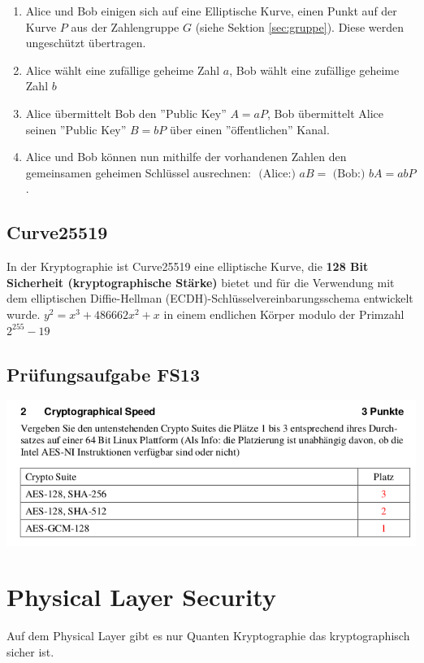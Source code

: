 \begin{enumerate}
	\item Alice und Bob einigen sich auf eine Elliptische Kurve, einen Punkt auf der Kurve $P$ aus der Zahlengruppe $G$ (siehe Sektion \ref{sec:gruppe}). Diese werden ungeschützt übertragen.
	\item Alice wählt eine zufällige geheime Zahl $a$, Bob wählt eine zufällige geheime Zahl $b$
	\item Alice übermittelt Bob den ''Public Key'' $A = aP$, Bob übermittelt Alice seinen ''Public Key'' $B = bP$ über einen ''öffentlichen'' Kanal.
	\item Alice und Bob können nun mithilfe der vorhandenen Zahlen den gemeinsamen geheimen Schlüssel ausrechnen: $\text{ (Alice:) } aB = \text{ (Bob:) } bA = abP$.
\end{enumerate}

\subsection{Curve25519}
In der Kryptographie ist Curve25519 eine elliptische Kurve, die \textbf{128 Bit Sicherheit (kryptographische Stärke)} bietet und für die Verwendung mit dem elliptischen Diffie-Hellman (ECDH)-Schlüsselvereinbarungsschema entwickelt wurde. 
$y^2 = x^3 + 486662x^2 + x$ in einem endlichen Körper modulo der Primzahl $2^{255} - 19$


\subsection{Prüfungsaufgabe FS13}
\begin{minipage}[t]{1\textwidth}
    \centering
	\includegraphics[width=0.9\linewidth]{images/fs13-crypto-speed.png}
    \caption{}
    \label{fig:keystrenghtcomparison}
\end{minipage}


\section{Physical Layer Security}
Auf dem Physical Layer gibt es nur Quanten Kryptographie das kryptographisch sicher ist.

